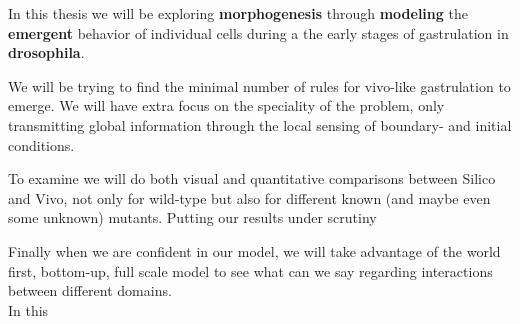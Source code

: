 In this thesis we will be exploring \textbf{morphogenesis} through \textbf{modeling} the \textbf{emergent} behavior of individual cells during a the early stages of  gastrulation in \textbf{drosophila}.

We will be trying to find the minimal number of rules for vivo-like gastrulation to emerge. We will have extra focus on the speciality of the problem, only transmitting global information through the local sensing of boundary- and initial conditions.

To examine we will do both visual and quantitative comparisons between Silico and Vivo, not only for wild-type but also for different known (and maybe even some unknown) mutants. Putting our results under scrutiny 

Finally when we are confident in our model, we will take advantage of the world first, bottom-up, full scale model to see what can we say regarding interactions between different domains.\\





In this





